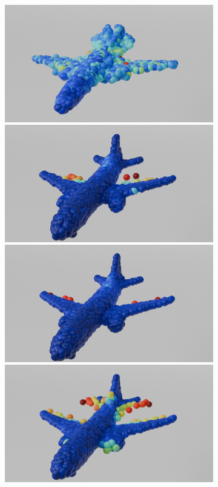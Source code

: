 \begin{figure}[htb]
\begin{subfigure}[t]{0.315\textwidth}
            \includegraphics[width=\textwidth]{figures/dc_lin_ap2.png}
            \includegraphics[width=\textwidth]{figures/do_lin_ap2.png}
            \includegraphics[width=\textwidth]{figures/ens_lin_ap2.png}
            \includegraphics[width=\textwidth]{figures/iml_lin_ap2.png}

\end{subfigure}
\end{figure}
